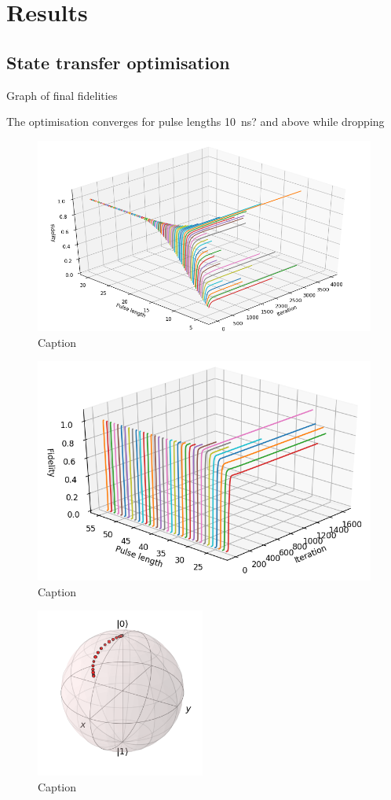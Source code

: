 \documentclass[main.tex]{subfiles}
\begin{document}
\chapter{Results}

\section{State transfer optimisation}
Graph of final fidelities

The optimisation converges for pulse lengths \SI{10}{\nano\second}? and above while dropping 

\begin{figure}
    \centering
    \includegraphics[width=\linewidth]{figs/3d-optim-ge.png}
    \caption{Caption}
    \label{fig:3d-optim-ge}
\end{figure}

\begin{figure}
    \centering
    \includegraphics[width=0.7\linewidth]{figs/3d-optim-gf.png}
    \caption{Caption}
    \label{fig:3d-optim-gf}
\end{figure}



\begin{figure}
    \centering
    \includegraphics[width=15em]{figs/bloch_evolution_4,25.png}
    \caption{Caption}
    \label{fig:my_label}
\end{figure}
\end{document}

